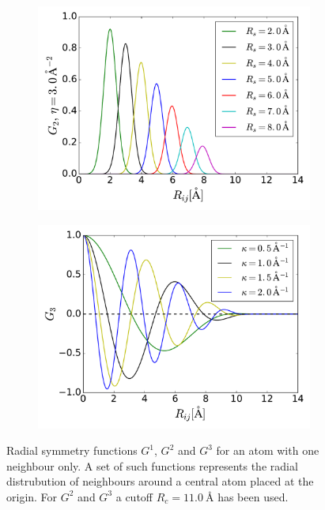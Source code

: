 \documentclass[twoside,english]{uiofysmaster}
\begin{document}
\begin{figure}[h]
\begin{subfigure}[b]{0.5\linewidth}
    \label{fig:radialSymmetriFunctions:b} 
    \vspace{1ex}
  \end{subfigure} 
  \begin{subfigure}[b]{0.5\linewidth}
    \centering
    \includegraphics[width=\linewidth]{Figures/Theory/G2_2.pdf} 
    \label{fig:radialSymmetriFunctions:c} 
  \end{subfigure}%
  \begin{subfigure}[b]{0.5\linewidth}
    \centering
    \includegraphics[width=\linewidth]{Figures/Theory/G3.pdf} 
    \label{fig:radialSymmetriFunctions:d} 
  \end{subfigure} 
  \caption{Radial symmetry functions $G^1$, $G^2$ and $G^3$ for an atom with one neighbour only. A set of such 
	   functions represents the radial distrubution of neighbours around a central atom placed at the origin.
	   For $G^2$ and $G^3$ a cutoff $R_c = \SI{11.0}{\angstrom}$ has been used.}
  \label{fig:radialSymmetriFunctions} 
\end{figure}
\end{document}
